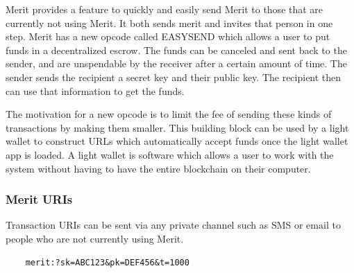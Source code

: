 \documentclass{article}
\begin{document}
Merit provides a feature to quickly and easily send Merit to those that are
currently not using Merit. It both sends merit and invites that person in one
step. Merit has a new opcode called EASYSEND which allows a user to put funds 
in a decentralized escrow. The funds can be canceled and sent back to the sender,
and are unspendable by the receiver after a certain amount of time. The sender
sends the recipient a secret key and their public key. The recipient then can
use that information to get the funds.

\begin{center}
\end{center}

The motivation for a new opcode is to limit the fee of sending these kinds of
transactions by making them smaller. This building block can be used by
a light wallet to construct URLs which automatically accept funds once
the light wallet app is loaded. A light wallet is software which allows a user
to work with the system without having to have the entire blockchain on their
computer.

\subsubsection{Merit URIs}
Transaction URIs can be sent via any private channel such as SMS or email to people
who are not currently using Merit.
   
\begin{verbatim}
    merit:?sk=ABC123&pk=DEF456&t=1000
\end{verbatim}

   
\end{document}
